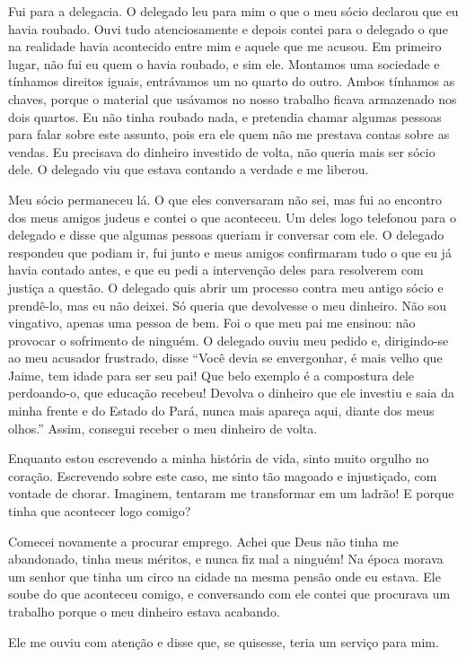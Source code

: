 Fui para a delegacia. O delegado leu para mim o que o meu sócio
declarou que eu havia roubado. Ouvi tudo atenciosamente e depois contei
para o delegado o que na realidade havia acontecido entre mim e aquele
que me acusou. Em primeiro lugar, não fui eu quem o havia
roubado, e sim ele. Montamos uma sociedade e tínhamos direitos iguais, 
entrávamos um no quarto do outro. Ambos tínhamos
as chaves, porque o material que usávamos no nosso trabalho
ficava armazenado nos dois quartos. Eu não tinha roubado nada, e pretendia
chamar algumas pessoas para falar sobre este assunto, pois era ele quem não
me prestava contas sobre as vendas. Eu precisava do dinheiro investido de volta, não queria
mais ser sócio dele. O delegado viu que estava contando a verdade e me
liberou.

Meu sócio permaneceu lá. O que eles conversaram não sei, mas fui ao
encontro dos meus amigos judeus e contei o que aconteceu. Um deles
logo telefonou para o delegado e disse que algumas pessoas queriam ir
conversar com ele. O delegado respondeu que podiam ir, fui junto e 
meus amigos confirmaram tudo o que eu já havia contado antes, e que eu
pedi a intervenção deles para resolverem com justiça a questão. O
delegado quis abrir um processo contra meu antigo sócio e prendê-lo,
mas eu não deixei. Só queria que devolvesse o meu dinheiro. Não sou
vingativo, apenas uma pessoa de bem. Foi o que meu pai me ensinou: não
provocar o sofrimento de ninguém. O delegado ouviu meu pedido e,
dirigindo-se ao meu acusador frustrado, disse ``Você devia se
envergonhar, é mais velho que Jaime, tem idade para ser seu pai! Que
belo exemplo é a compostura dele perdoando-o, que educação recebeu!
Devolva o dinheiro que ele investiu e saia da minha frente e do Estado
do Pará, nunca mais apareça aqui, diante dos meus olhos.'' Assim, 
consegui receber o meu dinheiro de volta.

Enquanto estou escrevendo a minha história de vida, sinto muito orgulho
no coração. Escrevendo sobre este caso, me sinto tão magoado e
injustiçado, com vontade de chorar. Imaginem, tentaram me transformar em
um ladrão! E porque tinha que acontecer logo comigo?

Comecei novamente a procurar emprego. Achei
que Deus não tinha me abandonado, tinha meus méritos, e nunca fiz 
mal a ninguém! Na época morava
um senhor que tinha um circo na cidade na mesma pensão onde eu estava. Ele soube do que
aconteceu comigo, e conversando com ele contei que procurava um trabalho
porque o meu dinheiro estava acabando.

Ele me ouviu com atenção e disse que, se quisesse, teria um serviço para
mim.


